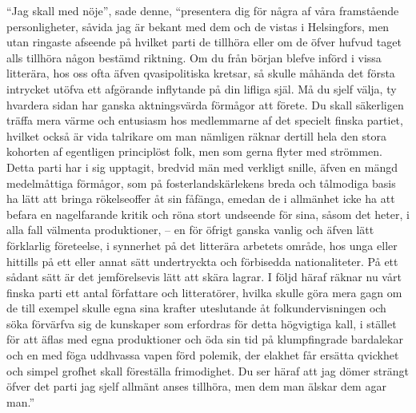 ``Jag skall med nöje'', sade denne, ``presentera dig för några af våra
framstående personligheter, såvida jag är bekant med dem och de vistas i
Helsingfors, men utan ringaste afseende på hvilket parti de tillhöra
eller om de öfver hufvud taget alls tillhöra någon bestämd riktning. Om
du från början blefve införd i vissa litterära, hos oss ofta äfven
qvasipolitiska kretsar, så skulle måhända det första intrycket utöfva
ett afgörande inflytande på din lifliga själ. Må du sjelf välja, ty
hvardera sidan har ganska aktningsvärda förmågor att förete. Du skall
säkerligen träffa mera värme och entusiasm hos medlemmarne af det
specielt finska partiet, hvilket också är vida talrikare om man nämligen
räknar dertill hela den stora kohorten af egentligen principlöst folk,
men som gerna flyter med strömmen. Detta parti har i sig upptagit,
bredvid män med verkligt snille, äfven en mängd medelmåttiga förmågor,
som på fosterlandskärlekens breda och tålmodiga basis ha lätt att bringa
rökelseoffer åt sin fåfänga, emedan de i allmänhet icke ha att befara en
nagelfarande kritik och röna stort undseende för sina, såsom det heter,
i alla fall välmenta produktioner, -- en för öfrigt ganska vanlig och
äfven lätt förklarlig företeelse, i synnerhet på det litterära arbetets
område, hos unga eller hittills på ett eller annat sätt undertryckta och
förbisedda nationaliteter. På ett sådant sätt är det jemförelsevis lätt
att skära lagrar. I följd häraf räknar nu vårt finska parti ett antal
författare och litteratörer, hvilka skulle göra mera gagn om de till
exempel skulle egna sina krafter uteslutande åt folkundervisningen och
söka förvärfva sig de kunskaper som erfordras för detta högvigtiga kall,
i stället för att äflas med egna produktioner och öda sin tid på
klumpfingrade bardalekar och en med föga uddhvassa vapen förd polemik,
der elakhet får ersätta qvickhet och simpel grofhet skall föreställa
frimodighet. Du ser häraf att jag dömer strängt öfver det parti jag
sjelf allmänt anses tillhöra, men dem man älskar dem agar man.''

